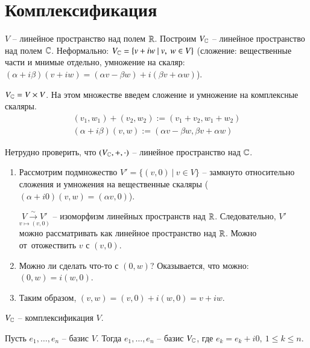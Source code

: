 \documentclass[main]{subfiles}
\begin{document}
\chapter{Комплексификация}


$V$ -- линейное пространство над полем $\mathbb{R}$. Построим $V_{\mathbb{C}}$ -- линейное пространство над
полем $\mathbb{C}$. Неформально: $V_{\mathbb{C}} = \{v +  iw \ | \ v, \ w \in V\}$ (сложение: вещественные части и мнимые отдельно, 
умножение на скаляр: $(\alpha + i\beta) (v + iw) = (\alpha v - \beta w) + i(\beta v + \alpha w)$).

$V_{\mathbb{C}} = V\times V$. На этом множестве введем сложение и умножение на комплексные скаляры.
\begin{gather*}
    (v_1,w_1) + (v_2, w_2) := (v_1 + v_2, w_1 + w_2)  \\
    (\alpha + i\beta) (v, w) := (\alpha v - \beta w, \beta v + \alpha w)
\end{gather*}

Нетрудно проверить, что $(V_{\mathbb{C}}, +, \cdot)$ -- линейное пространство над $\mathbb{C}$.

\begin{enumerate}
    \item Рассмотрим подмножество $V' = \{(v, 0) \ | \ v \in V\}$ -- 
    замкнуто относительно сложения и умножения на вещественные скаляры 
    ($(\alpha + i0)(v, w) = (\alpha v, 0)$).
    
    $\underset{v \mapsto (v, 0)}{V \xrightarrow{\sim} V'}$ -- изоморфизм линейных пространств над $\mathbb{R}$. Следовательно, 
    $V'$ можно рассматривать как линейное пространство над $\mathbb{R}$. Можно от отожествить $v$ с $(v, 0)$.
    \item Можно ли сделать что-то с $(0, w)$? Оказывается, что можно: $(0, w) = i(w, 0)$.
    \item Таким образом, $(v, w) = (v, 0) + i(w, 0) = v +iw$.
\end{enumerate}

$V_{\mathbb{C}}$ -- комплексификация $V$.

\begin{corollary}
    Пусть $e_1, \ldots, e_n$ -- базис $V$. Тогда $e_1, \ldots, e_n$ -- базис $V_{\mathbb{C}}$, где $e_k = e_k + i0, \ 1 \leqslant k\leqslant n $.
\end{corollary}
\end{document}
